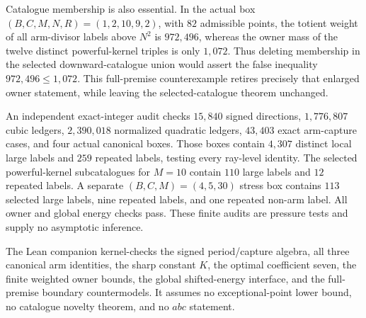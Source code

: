 Catalogue membership is also essential.  In the actual box
$(B,C,M,N,R)=(1,2,10,9,2)$, with $82$ admissible points, the totient weight
of all arm-divisor labels above $N^2$ is $972{,}496$, whereas the owner mass
of the twelve distinct powerful-kernel triples is only $1{,}072$.  Thus
deleting membership in the
selected downward-catalogue union would assert the false inequality
$972{,}496\le1{,}072$.  This full-premise counterexample retires precisely
that enlarged owner statement, while leaving the selected-catalogue theorem
unchanged.

An independent exact-integer audit checks $15{,}840$ signed directions,
$1{,}776{,}807$ cubic ledgers, $2{,}390{,}018$ normalized quadratic ledgers,
$43{,}403$ exact arm-capture cases, and four actual canonical boxes.  Those
boxes contain $4{,}307$ distinct local large labels and $259$ repeated
labels, testing every ray-level identity.  The selected powerful-kernel
subcatalogues for $M=10$ contain $110$ large labels and $12$ repeated labels.
A separate $(B,C,M)=(4,5,30)$ stress box contains $113$ selected large labels,
nine repeated labels, and one repeated non-arm label.  All owner and global
energy checks pass.  These finite audits are pressure tests and supply no
asymptotic inference.

The Lean companion kernel-checks the signed period/capture algebra, all three
canonical arm identities, the sharp constant $K$, the optimal coefficient
seven, the finite weighted owner bounds, the global shifted-energy interface,
and the full-premise boundary countermodels.  It assumes no exceptional-point
lower bound, no catalogue novelty theorem, and no $abc$ statement.
